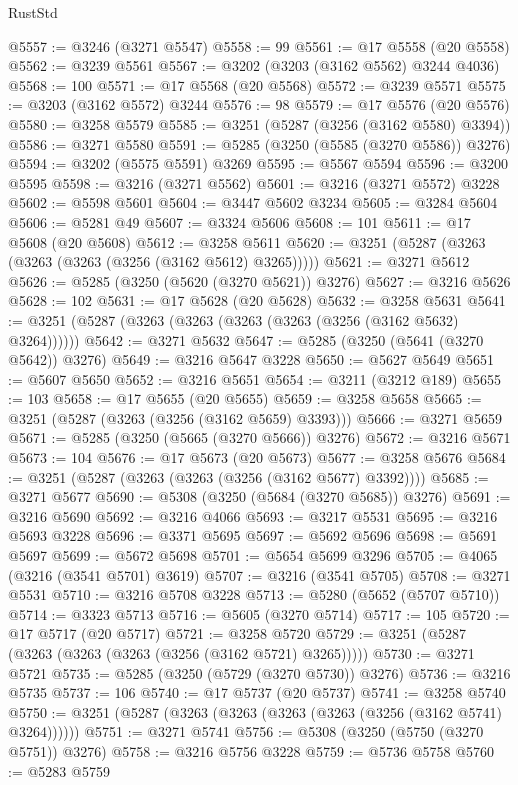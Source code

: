 \begin{lexlean}{RustStd}
\begin{coremodule}
@5557 := @3246 (@3271 @5547)
@5558 := 99
@5561 := @17 @5558 (@20 @5558)
@5562 := @3239 @5561
@5567 := @3202 (@3203 (@3162 @5562) @3244 @4036)
@5568 := 100
@5571 := @17 @5568 (@20 @5568)
@5572 := @3239 @5571
@5575 := @3203 (@3162 @5572) @3244
@5576 := 98
@5579 := @17 @5576 (@20 @5576)
@5580 := @3258 @5579
@5585 := @3251 (@5287 (@3256 (@3162 @5580) @3394))
@5586 := @3271 @5580
@5591 := @5285 (@3250 (@5585 (@3270 @5586)) @3276)
@5594 := @3202 (@5575 @5591) @3269
@5595 := @5567 @5594
@5596 := @3200 @5595
@5598 := @3216 (@3271 @5562)
@5601 := @3216 (@3271 @5572) @3228
@5602 := @5598 @5601
@5604 := @3447 @5602 @3234
@5605 := @3284 @5604
@5606 := @5281 @49
@5607 := @3324 @5606
@5608 := 101
@5611 := @17 @5608 (@20 @5608)
@5612 := @3258 @5611
@5620 := @3251 (@5287 (@3263 (@3263 (@3263 (@3256 (@3162 @5612) @3265)))))
@5621 := @3271 @5612
@5626 := @5285 (@3250 (@5620 (@3270 @5621)) @3276)
@5627 := @3216 @5626
@5628 := 102
@5631 := @17 @5628 (@20 @5628)
@5632 := @3258 @5631
@5641 := @3251 (@5287 (@3263 (@3263 (@3263 (@3263 (@3256 (@3162 @5632) @3264))))))
@5642 := @3271 @5632
@5647 := @5285 (@3250 (@5641 (@3270 @5642)) @3276)
@5649 := @3216 @5647 @3228
@5650 := @5627 @5649
@5651 := @5607 @5650
@5652 := @3216 @5651
@5654 := @3211 (@3212 @189)
@5655 := 103
@5658 := @17 @5655 (@20 @5655)
@5659 := @3258 @5658
@5665 := @3251 (@5287 (@3263 (@3256 (@3162 @5659) @3393)))
@5666 := @3271 @5659
@5671 := @5285 (@3250 (@5665 (@3270 @5666)) @3276)
@5672 := @3216 @5671
@5673 := 104
@5676 := @17 @5673 (@20 @5673)
@5677 := @3258 @5676
@5684 := @3251 (@5287 (@3263 (@3263 (@3256 (@3162 @5677) @3392))))
@5685 := @3271 @5677
@5690 := @5308 (@3250 (@5684 (@3270 @5685)) @3276)
@5691 := @3216 @5690
@5692 := @3216 @4066
@5693 := @3217 @5531
@5695 := @3216 @5693 @3228
@5696 := @3371 @5695
@5697 := @5692 @5696
@5698 := @5691 @5697
@5699 := @5672 @5698
@5701 := @5654 @5699 @3296
@5705 := @4065 (@3216 (@3541 @5701) @3619)
@5707 := @3216 (@3541 @5705)
@5708 := @3271 @5531
@5710 := @3216 @5708 @3228
@5713 := @5280 (@5652 (@5707 @5710))
@5714 := @3323 @5713
@5716 := @5605 (@3270 @5714)
@5717 := 105
@5720 := @17 @5717 (@20 @5717)
@5721 := @3258 @5720
@5729 := @3251 (@5287 (@3263 (@3263 (@3263 (@3256 (@3162 @5721) @3265)))))
@5730 := @3271 @5721
@5735 := @5285 (@3250 (@5729 (@3270 @5730)) @3276)
@5736 := @3216 @5735
@5737 := 106
@5740 := @17 @5737 (@20 @5737)
@5741 := @3258 @5740
@5750 := @3251 (@5287 (@3263 (@3263 (@3263 (@3263 (@3256 (@3162 @5741) @3264))))))
@5751 := @3271 @5741
@5756 := @5308 (@3250 (@5750 (@3270 @5751)) @3276)
@5758 := @3216 @5756 @3228
@5759 := @5736 @5758
@5760 := @5283 @5759

\end{coremodule}
\end{lexlean}
